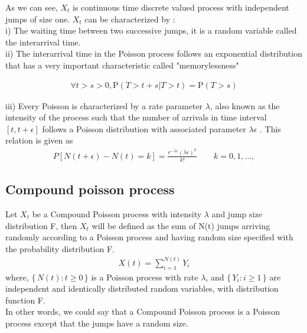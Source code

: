 \documentclass[12pt]{report}
\begin{document}
As we can see, $X_t$ is continuous time discrete valued process with independent jumps of size one. $X_t$ can be characterized by :\\

i) The waiting time between two successive jumps, it is a random variable called the interarrival time. \\
ii) The interarrival time in the Poisson process follows an exponential distribution that has a very important characteristic called "memorylessness" 

\begin{gather}
 \forall t > s > 0, \text{P}(T > t + s|T > t) = \text{P}(T > s)
\end{gather}

iii) Every Poisson is characterized by a rate parameter $\lambda$, also known as the intensity of the process such that the number of arrivals in time interval $[t, t + \epsilon]$ follows a Poisson distribution with associated parameter $\lambda \epsilon$ . This relation is given as
\begin{gather}
 P [N(t+ \epsilon) - N(t) = k] = \frac{e^{-\lambda \epsilon} (\lambda \epsilon)^k}{k!}  \qquad k= 0,1,\ldots,
\label{foo}
\end{gather} 
 
\subsection{Compound poisson process}
Let $X_t$ be a Compound Poisson process with intensity $\lambda$ and jump size distribution F, then $X_t$ will be defined as the sum of N(t) jumps arriving randomly according to a Poisson process and having random size specified with the probability distribution F.
\begin{gather}
X(t) = \sum_{i=1}^{N(t)} Y_i
\end{gather}
where,  $\{\,N(t) : t \geq 0\,\}$ is a Poisson process with rate $\lambda$, and $ \{\,Y_i : i \geq 1\,\}$ are independent and identically distributed random variables, with distribution function F.\\
In other words, we could say that a Compound Poisson process is a Poisson process except that the jumps have a random size.
\end{document}
